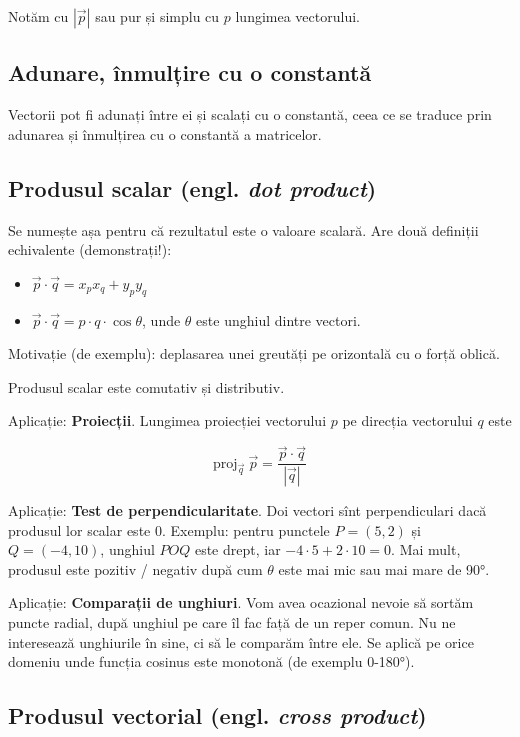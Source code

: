 \documentclass[../main.tex]{subfiles}
\begin{document}
Notăm cu $|\vec{p}|$ sau pur și simplu cu $p$ lungimea vectorului.

\subsection{Adunare, înmulțire cu o constantă}

Vectorii pot fi adunați între ei și scalați cu o constantă, ceea ce se traduce prin adunarea și înmulțirea cu o constantă a matricelor.

\subsection{Produsul scalar (engl. \textit{dot product})}

Se numește așa pentru că rezultatul este o valoare scalară. Are două definiții echivalente (demonstrați!):

\begin{itemize}
  \item $\vec{p} \cdot \vec{q} = x_p x_q + y_p y_q$
  \item $\vec{p} \cdot \vec{q} = p \cdot q \cdot \cos \theta$, unde $\theta$ este unghiul dintre vectori.
\end{itemize}

Motivație (de exemplu): deplasarea unei greutăți pe orizontală cu o forță oblică.

Produsul scalar este comutativ și distributiv.

Aplicație: \textbf{Proiecții}. Lungimea proiecției vectorului $p$ pe direcția vectorului $q$ este

$$\textrm{proj}_{\vec{q}}\ \vec{p} = \frac{\vec{p} \cdot \vec{q}}{|\vec{q}|}$$

Aplicație: \textbf{Test de perpendicularitate}. Doi vectori sînt perpendiculari dacă produsul lor scalar este 0. Exemplu: pentru punctele $P = (5, 2)$ și $Q = (-4, 10)$, unghiul $POQ$ este drept, iar $-4\cdot 5 + 2\cdot 10 = 0$. Mai mult, produsul este pozitiv / negativ după cum $\theta$ este mai mic sau mai mare de 90°.

Aplicație: \textbf{Comparații de unghiuri}. Vom avea ocazional nevoie să sortăm puncte radial, după unghiul pe care îl fac față de un reper comun. Nu ne interesează unghiurile în sine, ci să le comparăm între ele. Se aplică pe orice domeniu unde funcția cosinus este monotonă (de exemplu 0-180°).

\subsection{Produsul vectorial (engl. \textit{cross product})}
\end{document}
